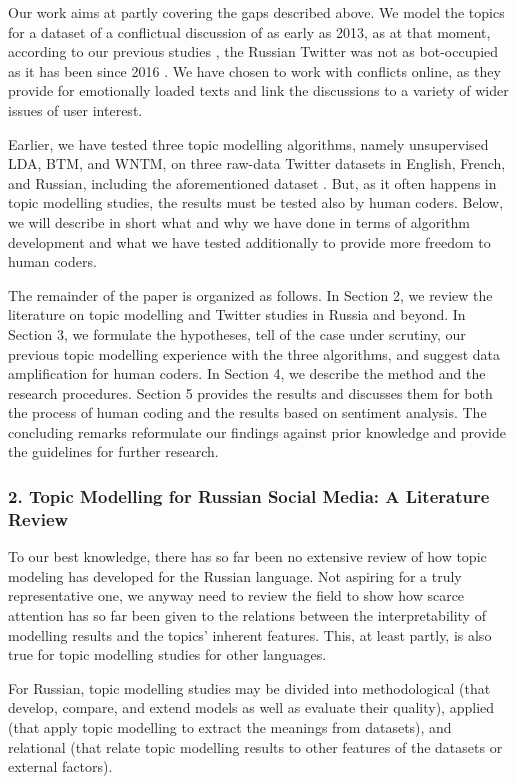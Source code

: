 Our work aims at partly covering the gaps described above. We model the topics for a dataset of a conflictual discussion of as early as 2013, as at that moment, according to our previous studies \cite{BodrunovaLitvinenkoBlekanov2017}, the Russian Twitter was not as bot-occupied as it has been since 2016 \cite{StukalSanovichBonneau}. We have chosen to work with conflicts online, as they provide for emotionally loaded texts and link the discussions to a variety of wider issues of user interest.

Earlier, we have tested three topic modelling algorithms, namely unsupervised LDA, BTM, and WNTM, on three raw-data Twitter datasets in English, French, and Russian, including the aforementioned dataset \cite{BlekanovTarasovMaksimov}. But, as it often happens in topic modelling studies, the results must be tested also by human coders. Below, we will describe in short what and why we have done in terms of algorithm development and what we have tested additionally to provide more freedom to human coders.

The remainder of the paper is organized as follows. In Section 2, we review the literature on topic modelling and Twitter studies in Russia and beyond. In Section 3, we formulate the hypotheses, tell of the case under scrutiny, our previous topic modelling experience with the three algorithms, and suggest data amplification for human coders. In Section 4, we describe the method and the research procedures. Section 5 provides the results and discusses them for both the process of human coding and the results based on sentiment analysis. The concluding remarks reformulate our findings against prior knowledge and provide the guidelines for further research.

\subsubsection{2. Topic Modelling for Russian Social Media: A Literature Review}

To our best knowledge, there has so far been no extensive review of how topic modeling has developed for the Russian language. Not aspiring for a truly representative one, we anyway need to review the field to show how scarce attention has so far been given to the relations between the interpretability of modelling results and the topics’ inherent features. This, at least partly, is also true for topic modelling studies for other languages.

For Russian, topic modelling studies may be divided into methodological (that develop, compare, and extend models as well as evaluate their quality), applied (that apply topic modelling to extract the meanings from datasets), and relational (that relate topic modelling results to other features of the datasets or external factors).

